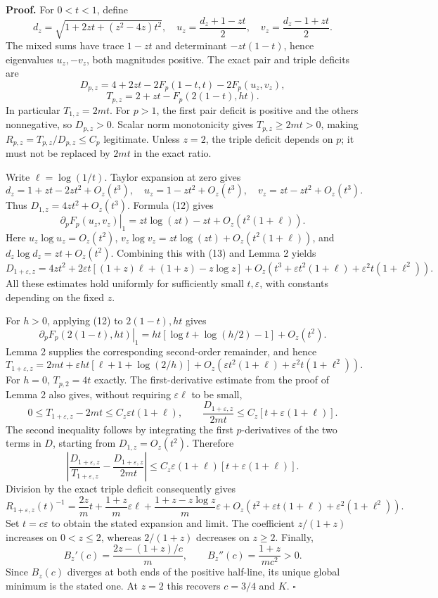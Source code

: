\documentclass[11pt,a4paper]{article}
\begin{document}
\textbf{Proof.} For \(0<t<1\), define \[
d_z=\sqrt{1+2zt+(z^2-4z)t^2},\quad
u_z=\frac{d_z+1-zt}{2},\quad v_z=\frac{d_z-1+zt}{2}.
\] The mixed sums have trace \(1-zt\) and determinant \(-zt(1-t)\), hence eigenvalues \(u_z,-v_z\), both magnitudes positive. The exact pair and triple deficits are \[
D_{p,z}=4+2zt-2F_p(1-t,t)-2F_p(u_z,v_z),
\] \[
T_{p,z}=2+zt-F_p(2(1-t),ht).
\] In particular \(T_{1,z}=2mt\). For \(p>1\), the first pair deficit is positive and the others nonnegative, so \(D_{p,z}>0\). Scalar norm monotonicity gives \(T_{p,z}\ge2mt>0\), making \(R_{p,z}=T_{p,z}/D_{p,z}\le C_p\) legitimate. Unless \(z=2\), the triple deficit depends on \(p\); it must not be replaced by \(2mt\) in the exact ratio.

Write \(\ell=\log(1/t)\). Taylor expansion at zero gives \[
d_z=1+zt-2zt^2+O_z(t^3),\quad
u_z=1-zt^2+O_z(t^3),\quad v_z=zt-zt^2+O_z(t^3).
\] Thus \(D_{1,z}=4zt^2+O_z(t^3)\). Formula (12) gives \[
\left.\partial_pF_p(u_z,v_z)\right|_{1}
=zt\log(zt)-zt+O_z(t^2(1+\ell)).
\] Here \(u_z\log u_z=O_z(t^2)\), \(v_z\log v_z=zt\log(zt)+O_z(t^2(1+\ell))\), and \(d_z\log d_z=zt+O_z(t^2)\). Combining this with (13) and Lemma 2 yields \[
D_{1+\varepsilon,z}
=4zt^2+2\varepsilon t[(1+z)\ell+(1+z)-z\log z]
+O_z(t^3+\varepsilon t^2(1+\ell)+\varepsilon^2t(1+\ell^2)).
\] All these estimates hold uniformly for sufficiently small \(t,\varepsilon\), with constants depending on the fixed \(z\).

For \(h>0\), applying (12) to \(2(1-t),ht\) gives \[
\left.\partial_pF_p(2(1-t),ht)\right|_1
=ht[\log t+\log(h/2)-1]+O_z(t^2).
\] Lemma 2 supplies the corresponding second-order remainder, and hence \[
T_{1+\varepsilon,z}
=2mt+\varepsilon ht[\ell+1+\log(2/h)]
+O_z(\varepsilon t^2(1+\ell)+\varepsilon^2t(1+\ell^2)).
\] For \(h=0\), \(T_{p,2}=4t\) exactly. The first-derivative estimate from the proof of Lemma 2 also gives, without requiring \(\varepsilon\ell\) to be small, \[
0\le T_{1+\varepsilon,z}-2mt\le C_z\varepsilon t(1+\ell),
\qquad
\frac{D_{1+\varepsilon,z}}{2mt}\le C_z[t+\varepsilon(1+\ell)].
\] The second inequality follows by integrating the first \(p\)-derivatives of the two terms in \(D\), starting from \(D_{1,z}=O_z(t^2)\). Therefore \[
\left|\frac{D_{1+\varepsilon,z}}{T_{1+\varepsilon,z}}
-\frac{D_{1+\varepsilon,z}}{2mt}\right|
\le C_z\varepsilon(1+\ell)[t+\varepsilon(1+\ell)].
\] Division by the exact triple deficit consequently gives \[
R_{1+\varepsilon,z}(t)^{-1}
=\frac{2z}{m}t+\frac{1+z}{m}\varepsilon\ell
+\frac{1+z-z\log z}{m}\varepsilon
+O_z(t^2+\varepsilon t(1+\ell)+\varepsilon^2(1+\ell^2)).
\] Set \(t=c\varepsilon\) to obtain the stated expansion and limit. The coefficient \(z/(1+z)\) increases on \(0<z\le2\), whereas \(2/(1+z)\) decreases on \(z\ge2\). Finally, \[
B_z'(c)=\frac{2z-(1+z)/c}{m},\qquad
B_z''(c)=\frac{1+z}{mc^2}>0.
\] Since \(B_z(c)\) diverges at both ends of the positive half-line, its unique global minimum is the stated one. At \(z=2\) this recovers \(c=3/4\) and \(K\). \(\square\)
\end{document}
